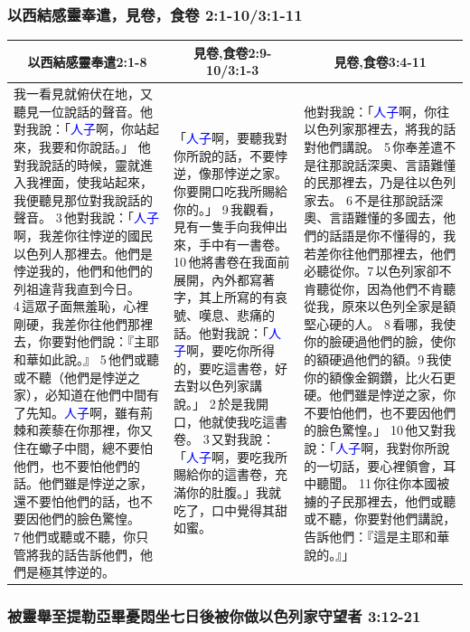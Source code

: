 \subsubsection{以西結感靈奉遣，見卷，食卷 2:1-10/3:1-11}

\begin{table}[H]
\centering
\begin{tabular}{p{6.5cm}|p{4.250cm}|p{6.550cm}}\hline\hline
\multicolumn{1}{c|}{以西結感靈奉遣2:1-8}&\multicolumn{1}{c}{見卷,食卷2:9-10/3:1-3}&\multicolumn{1}{c|}{見卷,食卷3:4-11}\\\hline
我一看見就俯伏在地，又聽見一位說話的聲音。他對我說：「\textcolor{blue}{人子}啊，你站起來，我要和你說話。」 他對我說話的時候，靈就進入我裡面，使我站起來，我便聽見那位對我說話的聲音。 3 他對我說：「\textcolor{blue}{人子}啊，我差你往悖逆的國民以色列人那裡去。他們是悖逆我的，他們和他們的列祖違背我直到今日。 4 這眾子面無羞恥，心裡剛硬，我差你往他們那裡去，你要對他們說：『主耶和華如此說。』 5 他們或聽或不聽（他們是悖逆之家），必知道在他們中間有了先知。\textcolor{blue}{人子}啊，雖有荊棘和蒺藜在你那裡，你又住在蠍子中間，總不要怕他們，也不要怕他們的話。他們雖是悖逆之家，還不要怕他們的話，也不要因他們的臉色驚惶。7 他們或聽或不聽，你只管將我的話告訴他們，他們是極其悖逆的。
&「\textcolor{blue}{人子}啊，要聽我對你所說的話，不要悖逆，像那悖逆之家。你要開口吃我所賜給你的。」 9 我觀看，見有一隻手向我伸出來，手中有一書卷。10 他將書卷在我面前展開，內外都寫著字，其上所寫的有哀號、嘆息、悲痛的話。他對我說：「\textcolor{blue}{人子}啊，要吃你所得的，要吃這書卷，好去對以色列家講說。」 2 於是我開口，他就使我吃這書卷。 3 又對我說：「\textcolor{blue}{人子}啊，要吃我所賜給你的這書卷，充滿你的肚腹。」我就吃了，口中覺得其甜如蜜。
&他對我說：「\textcolor{blue}{人子}啊，你往以色列家那裡去，將我的話對他們講說。 5 你奉差遣不是往那說話深奧、言語難懂的民那裡去，乃是往以色列家去。 6 不是往那說話深奧、言語難懂的多國去，他們的話語是你不懂得的，我若差你往他們那裡去，他們必聽從你。7 以色列家卻不肯聽從你，因為他們不肯聽從我，原來以色列全家是額堅心硬的人。 8 看哪，我使你的臉硬過他們的臉，使你的額硬過他們的額。9 我使你的額像金鋼鑽，比火石更硬。他們雖是悖逆之家，你不要怕他們，也不要因他們的臉色驚惶。」 10 他又對我說：「\textcolor{blue}{人子}啊，我對你所說的一切話，要心裡領會，耳中聽聞。 11 你往你本國被擄的子民那裡去，他們或聽或不聽，你要對他們講說，告訴他們：『這是主耶和華說的。』」\\\hline
\end{tabular}
\end{table}

\subsubsection{被靈舉至提勒亞畢憂悶坐七日後被你做以色列家守望者 3:12-21}

